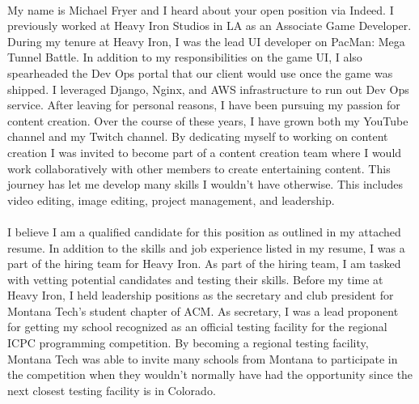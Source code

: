 \paragraph{}
My name is Michael Fryer and I heard about your open position via Indeed. I previously worked at Heavy Iron Studios in LA as an Associate Game Developer. During my tenure at Heavy Iron, I was the lead UI developer on PacMan: Mega Tunnel Battle. In addition to my responsibilities on the game UI, I also spearheaded the Dev Ops portal that our client would use once the game was shipped. I leveraged Django, Nginx, and AWS infrastructure to run out Dev Ops service. After leaving for personal reasons, I have been pursuing my passion for content creation. Over the course of these years, I have grown both my YouTube channel and my Twitch channel. By dedicating myself to working on content creation I was invited to become part of a content creation team where I would work collaboratively with other members to create entertaining content. This journey has let me develop many skills I wouldn't have otherwise. This includes video editing, image editing, project management, and leadership.

\paragraph{}
I believe I am a qualified candidate for this position as outlined in my attached resume. In addition to the skills and job experience listed in my resume, I was a part of the hiring team for Heavy Iron. As part of the hiring team, I am tasked with vetting potential candidates and testing their skills. Before my time at Heavy Iron, I held leadership positions as the secretary and club president for Montana Tech's student chapter of ACM. As secretary, I was a lead proponent for getting my school recognized as an official testing facility for the regional ICPC programming competition. By becoming a regional testing facility, Montana Tech was able to invite many schools from Montana to participate in the competition when they wouldn't normally have had the opportunity since the next closest testing facility is in Colorado.
